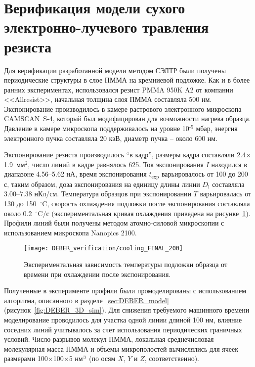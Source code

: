 \section{Верификация модели сухого электронно-лучевого травления резиста} \label{sec:verification}

Для верификации разработанной модели методом СЭЛТР были получены периодические структуры в слое ПММА на кремниевой подложке. Как и в более ранних экспериментах, использовался резист PMMA 950K A2 от компании <<Allresist>>, начальная толщина слоя ПММА составляла 500 нм. Экспонирование производилось в камере растрового электронного микроскопа CAMSCAN~S-4, который был модифицирован для возможности нагрева образца. Давление в камере микроскопа поддерживалось на уровне 10$^\text{-5}$ мбар, энергия электронного пучка составляла 20 кэВ, диаметр пучка -- около 600 нм.

Экспонирование резиста производилось ``в кадр'', размеры кадра составляли 2.4$\times$1.9~мм$^\text{2}$, число линий в кадре равнялось 625. Ток экспонирования $I$ находился в диапазоне 4.56--5.62 нА, время экспонирования $t_\mathrm{exp}$ варьировалось от 100 до 200 с, таким образом, доза экспонирования на единицу длины линии $D_\mathrm{l}$ составляла 3.00--7.38 нКл/см. Температура образцов при экспонировании $T$ варьировалась от 130 до 150~$^\circ$C, скорость охлаждения подложки после экспонирования составляла около 0.2~$^\circ$C/с (экспериментальная кривая охлаждения приведена на рисунке~\ref{fig:exp_cooling}). Профили линий были получены методом атомно-силовой микроскопии с использованием микроскопа Nanopics 2100.

\begin{figure}[h!]
	\begin{center}
		\texttt{[image: DEBER\_verification/cooling\_FINAL\_200]} \\
	\end{center}
	\vspace{-1em}
	\caption{Экспериментальная зависимость температуры подложки образца от времени при охлаждении после экспонирования.}
	\label{fig:exp_cooling}
	\vspace{1em}
\end{figure}

Полученные в эксперименте профили были промоделированы с использованием алгоритма, описанного в разделе~\ref{sec:DEBER_model} (рисунок~\ref{fig:DEBER_3D_sim}).
Для снижения требуемого машинного времени моделирование проводилось для участка одной линии длиной 100 нм, влияние соседних линий учитывалось за счет использования периодических граничных условий.
Число разрывов молекул ПММА, локальная среднечисловая молекулярная масса ПММА и объемы микрополостей вычислялись для ячеек размерами 100$\times$100$\times$5 нм$^\text{3}$ (по осям $X$, $Y$ и $Z$, соответственно).

